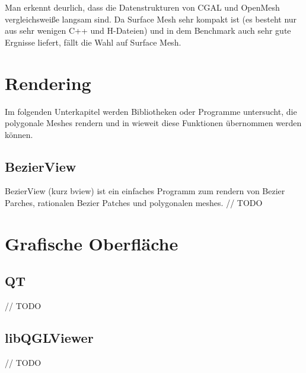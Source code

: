 Man erkennt deurlich, dass die Datenstrukturen von \acs{CGAL} und OpenMesh vergleichsweiße langsam sind.
Da Surface Mesh sehr kompakt ist (es besteht nur aus sehr wenigen C++ und H-Dateien) und in dem Benchmark
auch sehr gute Ergnisse liefert, fällt die Wahl auf Surface Mesh.


\section{Rendering}

Im folgenden Unterkapitel werden Bibliotheken oder Programme untersucht, die polygonale Meshes rendern
und in wieweit diese Funktionen übernommen werden können. 

\subsection{BezierView}

BezierView (kurz bview) ist ein einfaches Programm zum rendern von Bezier Parches, rationalen Bezier Patches und polygonalen meshes.
\cite{Peters.bview.27.07.2015}
// TODO

\section{Grafische Oberfläche}

\subsection{QT}

// TODO

\subsection{libQGLViewer}

// TODO
